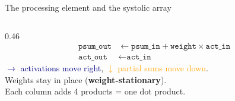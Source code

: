 \documentclass[aspectratio=169,10pt,t]{beamer}
\begin{document}
\begin{frame}{The processing element and the systolic array}
\begin{columns}[T]
\begin{column}{0.46\textwidth}
      \vspace{2pt}
      \footnotesize
      \begin{align*}
        \texttt{psum\_out} &\leftarrow \texttt{psum\_in} + \texttt{weight}\times\texttt{act\_in}\\
        \texttt{act\_out} &\leftarrow \texttt{act\_in}
      \end{align*}
      \scriptsize
      \textcolor{navy}{$\rightarrow$ activations move right}, \textcolor{orange}{$\downarrow$ partial sums move down}.\\
      Weights stay in place (\textbf{weight-stationary}).\\
      Each column adds 4 products = one dot product.
    \end{column}
  \end{columns}
\end{frame}
\end{document}
